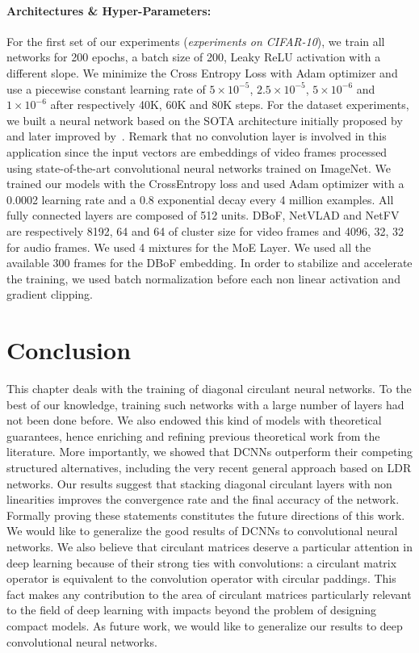 \paragraph{Architectures \& Hyper-Parameters:} 
For the first set of our experiments (\emph{experiments on CIFAR-10}), we train all networks for 200 epochs, a batch size of 200, Leaky ReLU activation with a different slope.
We minimize the Cross Entropy Loss with Adam optimizer and use a piecewise constant learning rate of $5 \times 10^{-5}$, $2.5\times10^{-5}$, $5\times10^{-6}$ and $1\times10^{-6}$ after respectively 40K, 60K and 80K steps.
For the \yt dataset experiments, we built a neural network based on the SOTA architecture initially proposed by~\citet{abu2016youtube} and later improved by~\citet{miech2017learnable}.
Remark that no convolution layer is involved in this application since the input vectors are embeddings of video frames processed using state-of-the-art convolutional neural networks trained on ImageNet.
We trained our models with the CrossEntropy loss and used Adam optimizer with a 0.0002 learning rate and a 0.8 exponential decay every 4 million examples.
All fully connected layers are composed of 512 units.
DBoF, NetVLAD and NetFV are respectively 8192, 64 and 64 of cluster size for video frames and 4096, 32, 32 for audio frames.
We used 4 mixtures for the MoE Layer.
We used all the available 300 frames for the DBoF embedding.
In order to stabilize and accelerate the training, we used batch normalization before each non linear activation and gradient clipping. 

\section{Conclusion}
\label{section:ch4-conclusion}

This chapter deals with the training of diagonal circulant neural networks.
To the best of our knowledge, training such networks with a large number of layers had not been done before.
We also endowed this kind of models with theoretical guarantees, hence enriching and refining previous theoretical work from the literature.
More importantly, we showed that DCNNs outperform their competing structured alternatives, including the very recent general approach based on LDR networks.
Our results suggest that stacking diagonal circulant layers with non linearities improves the convergence rate and the final accuracy of the network.
Formally proving these statements constitutes the future directions of this work.
We would like to generalize the good results of DCNNs to convolutional neural networks.
We also believe that circulant matrices deserve a particular attention in deep learning because of their strong ties with convolutions: a circulant matrix operator is equivalent to the convolution operator with circular paddings.
This fact makes any contribution to the area of circulant matrices particularly relevant to the field of deep learning with impacts beyond the problem of designing compact models.
As future work, we would like to generalize our results to deep convolutional neural networks. 


